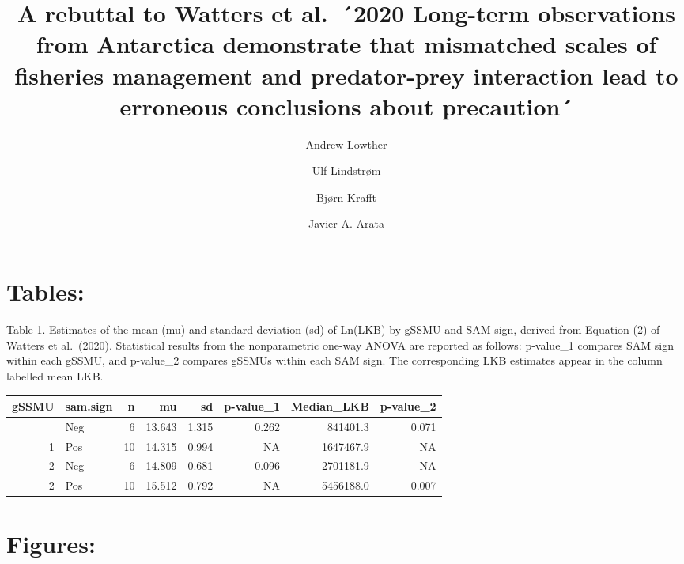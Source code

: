 \documentclass[]{elsarticle} %
\begin{document}
\begin{frontmatter}

  \title{A rebuttal to Watters et al.~´2020 Long-term observations from
Antarctica demonstrate that mismatched scales of fisheries management
and predator-prey interaction lead to erroneous conclusions about
precaution´}
    \author[1]{Andrew Lowther%
  }
  
    \author[2]{Ulf Lindstrøm%
  }
  
    \author[3]{Bjørn Krafft%
  }
  
    \author[4]{Javier A. Arata%
  }
  
  
  \begin{abstract}
  
  \end{abstract}
  
 \end{frontmatter}

\hypertarget{tables}{%
\section{Tables:}\label{tables}}

Table 1. Estimates of the mean (mu) and standard deviation (sd) of
Ln(LKB) by gSSMU and SAM sign, derived from Equation (2) of Watters et
al.~(2020). Statistical results from the nonparametric one-way ANOVA are
reported as follows: p-value\_1 compares SAM sign within each gSSMU, and
p-value\_2 compares gSSMUs within each SAM sign. The corresponding LKB
estimates appear in the column labelled mean LKB.

\begin{longtable}[]{@{}rlrrrrrr@{}}
\toprule\noalign{}
gSSMU & sam.sign & n & mu & sd & p-value\_1 & Median\_LKB &
p-value\_2 \\
\midrule\noalign{}
\endhead
\bottomrule\noalign{}
\endlastfoot
1 & Neg & 6 & 13.643 & 1.315 & 0.262 & 841401.3 & 0.071 \\
1 & Pos & 10 & 14.315 & 0.994 & NA & 1647467.9 & NA \\
2 & Neg & 6 & 14.809 & 0.681 & 0.096 & 2701181.9 & NA \\
2 & Pos & 10 & 15.512 & 0.792 & NA & 5456188.0 & 0.007 \\
\end{longtable}

\newpage

\hypertarget{figures}{%
\section{Figures:}\label{figures}}
\end{document}
